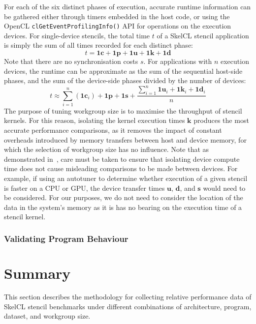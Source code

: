 For each of the six distinct phases of execution, accurate runtime
information can be gathered either through timers embedded in the host
code, or using the OpenCL \texttt{clGetEventProfilingInfo()} API for
operations on the execution devices. For single-device stencils, the
total time $t$ of a SkelCL stencil application is simply the sum of
all times recorded for each distinct phase:
%
\begin{equation}
t = \bm{1c} + \bm{1p} + \bm{1u} + \bm{1k} + \bm{1d}
\end{equation}
%
Note that there are no synchronisation costs $s$. For applications
with $n$ execution devices, the runtime can be approximate as the sum
of the sequential host-side phases, and the sum of the device-side
phases divided by the number of devices:
%
\begin{equation}
t \approx \sum_{i=1}^n{(\bm{1c}_{i})} + \bm{1p} + \bm{1s} +
  \frac{\sum_{i=1}^n{\bm{1u}_{i} + \bm{1k}_{i} + \bm{1d}_{i}}}{n}
\end{equation}
%
The purpose of tuning workgroup size is to maximise the throughput of
stencil kernels. For this reason, isolating the kernel execution times
$\bm{k}$ produces the most accurate performance comparisons, as it
removes the impact of constant overheads introduced by memory
transfers between host and device memory, for which the selection of
workgroup size has no influence. Note that as demonstrated
in~\cite{Gregg2011}, care must be taken to ensure that isolating
device compute time does not cause misleading comparisons to be made
between devices. For example, if using an autotuner to determine
whether execution of a given stencil is faster on a CPU or GPU, the
device transfer times $\bm{u}$, $\bm{d}$, and $\bm{s}$ would need to
be considered. For our purposes, we do not need to consider the
location of the data in the system's memory as it is has no bearing on
the execution time of a stencil kernel.


\subsubsection{Validating Program Behaviour}



\section{Summary}

This section describes the methodology for collecting relative
performance data of SkelCL stencil benchmarks under different
combinations of architecture, program, dataset, and workgroup size.
